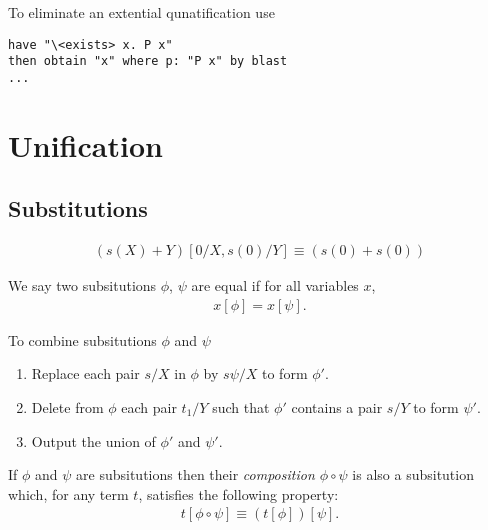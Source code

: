 \documentclass{article}
\begin{document}
\begin{definition}
	To eliminate an extential qunatification use
	\begin{verbatim}
have "\<exists> x. P x"
then obtain "x" where p: "P x" by blast
...	
	\end{verbatim}
\end{definition}

\section{Unification}

\subsection{Substitutions}

\begin{example}
	\begin{align*}
		(s(X)+Y)[0/X,s(0)/Y]\equiv (s(0)+s(0))
	\end{align*}
\end{example}

\begin{definition}
	We say two subsitutions $\phi$, $\psi$ are equal if for all variables $x$,
	\begin{align*}
		x[\phi] = x[\psi].
	\end{align*}
\end{definition}

\begin{definition}
	To combine subsitutions $\phi$ and $\psi$
	\begin{enumerate}
		\item Replace each pair $s/X$ in $\phi$ by $s\psi/X$ to form $\phi'$.
		\item Delete from $\phi$ each pair $t_1/Y$ such that $\phi'$ contains a pair $s/Y$ to form $\psi'$.
		\item Output the union of $\phi'$ and $\psi'$.
	\end{enumerate}
\end{definition}

\begin{definition}
	If $\phi$ and $\psi$ are subsitutions then their \emph{composition $\phi\circ\psi$}
	is also a subsitution which, for any term $t$, satisfies the following property:
	\begin{align*}
		t[\phi\circ\psi] \equiv (t[\phi])[\psi].
	\end{align*}
\end{definition}
\end{document}
